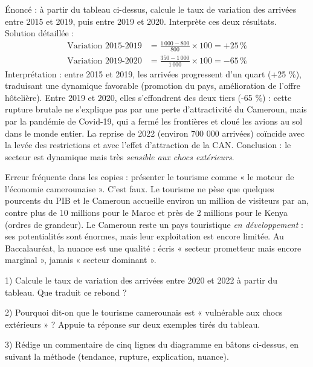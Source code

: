 \documentclass[11pt]{article}
\begin{document}
\begin{exoresolu}
Énoncé : à partir du tableau ci-dessus, calcule le taux de variation des arrivées entre 2015 et 2019, puis entre 2019 et 2020. Interprète ces deux résultats.
\tcblower
Solution détaillée :
\begin{align*}
\text{Variation 2015-2019} &= \frac{1\,000 - 800}{800} \times 100 = +25\,\% \\
\text{Variation 2019-2020} &= \frac{350 - 1\,000}{1\,000} \times 100 = -65\,\%
\end{align*}
Interprétation : entre 2015 et 2019, les arrivées progressent d'un quart (+25 \%), traduisant une dynamique favorable (promotion du pays, amélioration de l'offre hôtelière). Entre 2019 et 2020, elles s'effondrent des deux tiers (-65 \%) : cette rupture brutale ne s'explique pas par une perte d'attractivité du Cameroun, mais par la pandémie de Covid-19, qui a fermé les frontières et cloué les avions au sol dans le monde entier. La reprise de 2022 (environ 700 000 arrivées) coïncide avec la levée des restrictions et avec l'effet d'attraction de la CAN. Conclusion : le secteur est dynamique mais très \emph{sensible aux chocs extérieurs}.
\end{exoresolu}

\begin{attention}
Erreur fréquente dans les copies : présenter le tourisme comme « le moteur de l'économie camerounaise ». C'est faux. Le tourisme ne pèse que quelques pourcents du PIB et le Cameroun accueille environ un million de visiteurs par an, contre plus de 10 millions pour le Maroc et près de 2 millions pour le Kenya (ordres de grandeur). Le Cameroun reste un pays touristique \emph{en développement} : ses potentialités sont énormes, mais leur exploitation est encore limitée. Au Baccalauréat, la nuance est une qualité : écris « secteur prometteur mais encore marginal », jamais « secteur dominant ».
\end{attention}

\begin{exercice}
1) Calcule le taux de variation des arrivées entre 2020 et 2022 à partir du tableau. Que traduit ce rebond ? \par
2) Pourquoi dit-on que le tourisme camerounais est « vulnérable aux chocs extérieurs » ? Appuie ta réponse sur deux exemples tirés du tableau. \par
3) Rédige un commentaire de cinq lignes du diagramme en bâtons ci-dessus, en suivant la méthode (tendance, rupture, explication, nuance).
\end{exercice}
\end{document}
